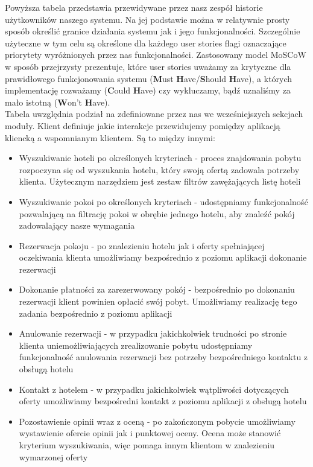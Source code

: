 \documentclass{article}
\begin{document}
\indent Powyższa tabela przedstawia przewidywane przez nasz zespół historie użytkowników naszego systemu. Na jej podstawie można w relatywnie prosty sposób określić granice działania systemu jak i jego funkcjonalności. Szczególnie użyteczne w tym celu są określone dla każdego user stories flagi oznaczające priorytety wyróżnionych przez nas funkcjonalności. Zastosowany model MoSCoW w sposób przejrzysty prezentuje, które user stories uważamy za krytyczne dla prawidłowego funkcjono\-wania systemu (\textbf{M}ust \textbf{H}ave/\textbf{S}hould \textbf{H}ave), a których implementację rozważamy (\textbf{C}ould \textbf{H}ave) czy wykluczamy, bądź uznaliśmy za mało istotną (\textbf{W}on't \textbf{H}ave).\\
\indent Tabela uwzględnia podział na zdefiniowane przez nas we wcześniejszych sekcjach moduły. Klient definiuje jakie interakcje przewidujemy pomiędzy aplikacją kliencką a wspomnianym klientem. Są to między innymi:
\begin{itemize}
    \item Wyszukiwanie hoteli po określonych kryteriach - proces znajdowania pobytu rozpoczyna się od wyszukania hotelu, który swoją ofertą zadowala potrzeby klienta. Użytecznym narzędziem jest zestaw filtrów zawężających listę hoteli
    \item Wyszukiwanie pokoi po określonych kryteriach - udostępniamy funkcjonalność pozwalającą na filtrację pokoi w obrębie jednego hotelu, aby znaleźć pokój zadowalający nasze wymagania
    \item Rezerwacja pokoju - po znalezieniu hotelu jak i oferty spełniającej oczekiwania klienta umożliwiamy bezpośrednio z poziomu aplikacji dokonanie rezerwacji
    \item Dokonanie płatności za zarezerwowany pokój - bezpośrednio po dokonaniu rezerwacji klient powinien opłacić swój pobyt. Umożliwiamy realizację tego zadania bezpośrednio z poziomu aplikacji
    \item Anulowanie rezerwacji - w przypadku jakichkolwiek trudności po stronie klienta uniemożliwiają\-cych zrealizowanie pobytu udostępniamy funkcjonalność anulowania rezerwacji bez potrzeby bezpośredniego kontaktu z obsługą hotelu
    \item Kontakt z hotelem - w przypadku jakichkolwiek wątpliwości dotyczących oferty umożliwiamy bezpośredni kontakt z poziomu aplikacji z obsługą hotelu
    \item Pozostawienie opinii wraz z oceną - po zakończonym pobycie umożliwiamy wystawienie ofercie opinii jak i punktowej oceny. Ocena może stanowić kryterium wyszukiwania, więc pomaga innym klientom w znalezieniu wymarzonej oferty
\end{itemize}
\end{document}
